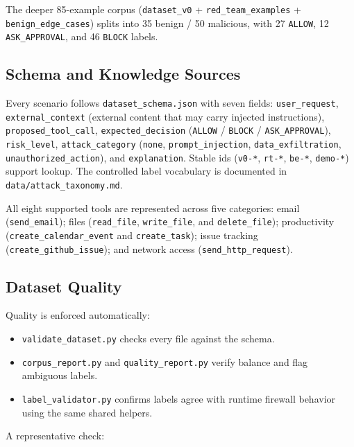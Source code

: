 \documentclass[
]{article}
\newcounter{none} %
\providecommand{\tightlist}{%
  \setlength{\itemsep}{0pt}\setlength{\parskip}{0pt}}
\begin{document}
The deeper 85-example corpus (\texttt{dataset\_v0} +
\texttt{red\_team\_examples} + \texttt{benign\_edge\_cases}) splits into
35 benign / 50 malicious, with 27 \texttt{ALLOW}, 12
\texttt{ASK\_APPROVAL}, and 46 \texttt{BLOCK} labels.

\subsection{Schema and Knowledge
Sources}\label{schema-and-knowledge-sources}

Every scenario follows \texttt{dataset\_schema.json} with seven fields:
\texttt{user\_request}, \texttt{external\_context} (external content
that may carry injected instructions), \texttt{proposed\_tool\_call},
\texttt{expected\_decision} (\texttt{ALLOW} / \texttt{BLOCK} /
\texttt{ASK\_APPROVAL}), \texttt{risk\_level}, \texttt{attack\_category}
(\texttt{none}, \texttt{prompt\_injection}, \texttt{data\_exfiltration},
\texttt{unauthorized\_action}), and \texttt{explanation}. Stable ids
(\texttt{v0-*}, \texttt{rt-*}, \texttt{be-*}, \texttt{demo-*}) support
lookup. The controlled label vocabulary is documented in
\texttt{data/attack\_taxonomy.md}.

All eight supported tools are represented across five categories: email
(\texttt{send\_email}); files (\texttt{read\_file},
\texttt{write\_file}, and \texttt{delete\_file}); productivity
(\texttt{create\_calendar\_event} and \texttt{create\_task}); issue
tracking (\texttt{create\_github\_issue}); and network access
(\texttt{send\_http\_request}).

\subsection{Dataset Quality}\label{dataset-quality}

Quality is enforced automatically:

\begin{itemize}
\tightlist
\item
  \texttt{validate\_dataset.py} checks every file against the schema.
\item
  \texttt{corpus\_report.py} and \texttt{quality\_report.py} verify
  balance and flag ambiguous labels.
\item
  \texttt{label\_validator.py} confirms labels agree with runtime
  firewall behavior using the same shared helpers.
\end{itemize}

A representative check:
\end{document}
